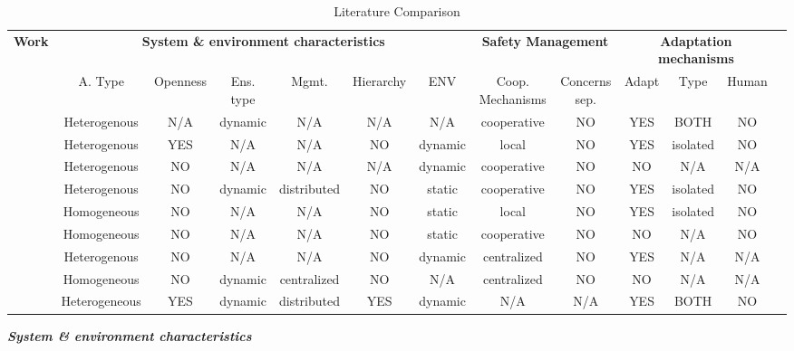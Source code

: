 \documentclass[journal]{IEEEtran}
\theoremstyle{definition}
\begin{document}
\renewcommand{\arraystretch}{1.0}
\begin{table}[bth]
\footnotesize
\begin{tabular}{|c|c|c|c|c|c|c|c|c|c|c|c|c|}
\hline
\multirow{2}{*}{{\bf Work}}&
\multicolumn{6}{|c|}{\textbf{System \& environment characteristics}} 
&\multicolumn{2}{|c|}{\textbf{Safety Management}}
&\multicolumn{3}{|c|}{\textbf{Adaptation mechanisms}}\\
\cline{2-12}
& A. Type & Openness & Ens. type & Mgmt. & Hierarchy &  ENV & Coop. Mechanisms & Concerns sep. & Adapt &Type  & Human \\
\hline

\cite{cui2014refresh} & Heterogenous & N/A & dynamic & N/A & N/A & N/A & cooperative & NO & YES & BOTH & NO\\
\cite{parker1998alliance} & Heterogenous & YES & N/A & N/A & NO &  dynamic & local & NO & YES & isolated & NO \\
\cite{morais2015distributed}& Heterogenous & NO & N/A & N/A &  N/A & dynamic & cooperative & NO & NO & N/A & N/A  \\

\cite{khan2015framework} & Heterogenous & NO & dynamic & distributed & NO & static & cooperative & NO  & YES & isolated & NO\\
\cite{castello2016adaptive} & Homogeneous & NO & N/A & N/A & NO  & static & local & NO & YES & isolated & NO\\
\cite{desai2017drona} & Homogeneous & NO & N/A & N/A & NO & static & cooperative & NO & NO & N/A & NO \\
\cite{decastro2018collision} &  Heterogenous & NO & N/A & N/A &  NO & dynamic & centralized & NO & YES & N/A & N/A \\
\cite{desai2016dynamically}  & Homogeneous & NO & dynamic & centralized & NO & N/A & centralized & NO & NO & N/A & N/A\\
\cite{alrahman2016power} & Heterogeneous & YES & dynamic & distributed & YES & dynamic & N/A & N/A & YES & BOTH & NO \\
\hline
\end{tabular}
\caption{Literature Comparison}
\label{tab:literature}
\end{table}



\textbf{\textit{System \& environment characteristics}}
\end{document}
